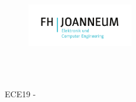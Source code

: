 \begin{titlepage}
    \begin{figure}[h]
        \raggedleft
        \includegraphics[height=5em]{assets/pictures/fh-logo.pdf}
    \end{figure}

    \vspace*{5cm}
    \begin{center}
        \Huge{\textbf{\lecture}}\\
        \LARGE{\documenTitle}\\
        \vspace{6pt}
    \end{center}

    \vspace*{\fill}
    \noindent\large{ECE19 - \semester~\\\firstStudent~\\\secondStudent~\\
    \lectureDate}




\end{titlepage}
